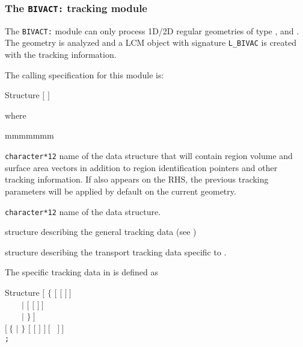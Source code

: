 \subsubsection{The {\tt BIVACT:} tracking module}\label{sect:BIVACData}

The {\tt BIVACT:} module can only process 1D/2D regular geometries
of type ,  and . The geometry is analyzed and
a LCM object with signature {\tt L\_BIVAC} is created with the tracking information.

\vskip 0.2cm

The calling specification for this module is:

\begin{DataStructure}{Structure }
\moc{:=}  $[$  $]$ 
 \moc{::}   
\end{DataStructure}

\noindent  where
\begin{ListeDeDescription}{mmmmmmm}

\item[\dusa{TRKNAM}] {\tt character*12} name of the  data
structure that will contain region volume and surface area vectors in
addition to region identification pointers and other tracking information.
If  also appears on the RHS, the previous tracking 
parameters will be applied by default on the current geometry.

\item[\dusa{GEONAM}] {\tt character*12} name of the  data
structure.

\item[\dstr{desctrack}] structure describing the general tracking data (see
)

\item[\dstr{descbivac}] structure describing the transport tracking data
specific to .

\end{ListeDeDescription}

\vskip 0.2cm

The  specific tracking data in  is defined as

\begin{DataStructure}{Structure }
$[$ $\{$  $[$   $[$  $]~]$ \\
~~~~$|$  $[$   $[$  $]~]$ \\
~~~~$|$   $\}~]$ \\
$[~\{$  $|$  $\}$  $[$  $[$  $]$  $]~[$  ~$]~]$ \\
{\tt ;}
\end{DataStructure}

